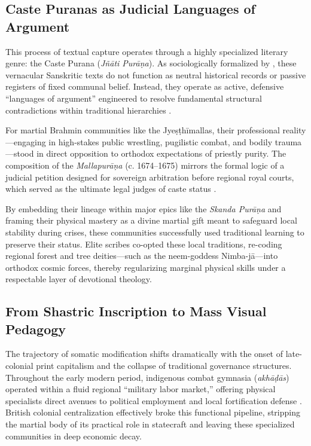 \documentclass[11pt,twoside,letterpaper]{article}
\begin{document}
\subsection{Caste Puranas as Judicial Languages of Argument}
This process of textual capture operates through a highly specialized literary genre: the Caste Purana (\textit{Jñāti Purāṇa}). As sociologically formalized by \citet{Das1968}, these vernacular Sanskritic texts do not function as neutral historical records or passive registers of fixed communal belief. Instead, they operate as active, defensive ``languages of argument'' engineered to resolve fundamental structural contradictions within traditional hierarchies \citep{Das1968}.

For martial Brahmin communities like the Jyeṣṭhīmallas, their professional reality—engaging in high-stakes public wrestling, pugilistic combat, and bodily trauma—stood in direct opposition to orthodox expectations of priestly purity. The composition of the \textit{Mallapurāṇa} (c. 1674–1675) mirrors the formal logic of a judicial petition designed for sovereign arbitration before regional royal courts, which served as the ultimate legal judges of caste status \citep{Das1968}. 

By embedding their lineage within major epics like the \textit{Skanda Purāṇa} and framing their physical mastery as a divine martial gift meant to safeguard local stability during crises, these communities successfully used traditional learning to preserve their status. Elite scribes co-opted these local traditions, re-coding regional forest and tree deities—such as the neem-goddess Nimba-jā—into orthodox cosmic forces, thereby regularizing marginal physical skills under a respectable layer of devotional theology.

\subsection{From Shastric Inscription to Mass Visual Pedagogy}
The trajectory of somatic modification shifts dramatically with the onset of late-colonial print capitalism and the collapse of traditional governance structures. Throughout the early modern period, indigenous combat gymnasia (\textit{akhāḍās}) operated within a fluid regional ``military labor market,'' offering physical specialists direct avenues to political employment and local fortification defense \citep{Thomas2025}. British colonial centralization effectively broke this functional pipeline, stripping the martial body of its practical role in statecraft and leaving these specialized communities in deep economic decay.
\end{document}
